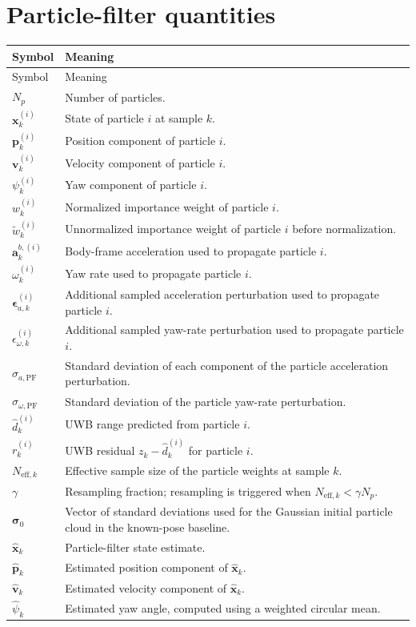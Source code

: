 \section*{Particle-filter quantities}
\begin{longtable}{p{}p{}}
\toprule
Symbol & Meaning\\
\midrule
\endfirsthead
\toprule
Symbol & Meaning\\
\midrule
\endhead
$N_p$ & Number of particles.\\
$\bm{x}_k^{(i)}$ & State of particle $i$ at sample $k$.\\
$\bm{p}_k^{(i)}$ & Position component of particle $i$.\\
$\bm{v}_k^{(i)}$ & Velocity component of particle $i$.\\
$\psi_k^{(i)}$ & Yaw component of particle $i$.\\
$w_k^{(i)}$ & Normalized importance weight of particle $i$.\\
$\tilde w_k^{(i)}$ & Unnormalized importance weight of particle $i$ before normalization.\\
$\bm{a}_{k}^{b,(i)}$ & Body-frame acceleration used to propagate particle $i$.\\
$\omega_k^{(i)}$ & Yaw rate used to propagate particle $i$.\\
$\bm{\epsilon}_{a,k}^{(i)}$ & Additional sampled acceleration perturbation used to propagate particle $i$.\\
$\epsilon_{\omega,k}^{(i)}$ & Additional sampled yaw-rate perturbation used to propagate particle $i$.\\
$\sigma_{a,\mathrm{PF}}$ & Standard deviation of each component of the particle acceleration perturbation.\\
$\sigma_{\omega,\mathrm{PF}}$ & Standard deviation of the particle yaw-rate perturbation.\\
$\hat d_k^{(i)}$ & UWB range predicted from particle $i$.\\
$r_k^{(i)}$ & UWB residual $z_k-\hat d_k^{(i)}$ for particle $i$.\\
$N_{\mathrm{eff},k}$ & Effective sample size of the particle weights at sample $k$.\\
$\gamma$ & Resampling fraction; resampling is triggered when $N_{\mathrm{eff},k}<\gamma N_p$.\\
$\bm{\sigma}_0$ & Vector of standard deviations used for the Gaussian initial particle cloud in the known-pose baseline.\\
$\hat{\bm{x}}_k$ & Particle-filter state estimate.\\
$\hat{\bm{p}}_k$ & Estimated position component of $\hat{\bm{x}}_k$.\\
$\hat{\bm{v}}_k$ & Estimated velocity component of $\hat{\bm{x}}_k$.\\
$\hat{\psi}_k$ & Estimated yaw angle, computed using a weighted circular mean.\\
\bottomrule
\end{longtable}

